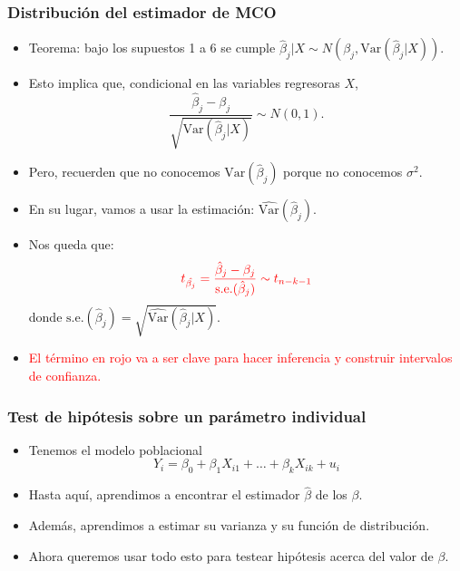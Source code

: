 \documentclass{beamer}
\begin{document}
\begin{frame}[shrink=10]
\frametitle{Distribución del estimador de MCO}
\begin{itemize}
    \item Teorema: bajo los supuestos 1 a 6 se cumple $\hat{\beta}_j|X \sim N(\beta_j, \text{Var}(\hat{\beta}_j|X))$.
    \item Esto implica que, condicional en las variables regresoras $X$,
    $$\frac{\hat{\beta}_j - \beta_j}{\sqrt{\text{Var}(\hat{\beta}_j|X)}} \sim N(0, 1).$$
    \item Pero, recuerden que no conocemos $\text{Var}(\hat{\beta}_j)$ porque no conocemos $\sigma^2$.
    \item En su lugar, vamos a usar la estimación: $\hat{\text{Var}}(\hat{\beta}_j)$.
    \item Nos queda que:
    $$\color{red}t_{\hat{\beta_j}}=\frac{\hat{\beta}_j - \beta_j}{\text{s.e.}(\hat{\beta}_j)} \sim t_{n-k-1}$$ 
    donde $\text{s.e.}(\hat{\beta}_j) = \sqrt{\hat{\text{Var}}(\hat{\beta}_j|X)}$.
    \item \textcolor{red}{El término en rojo va a ser clave para hacer inferencia y construir intervalos de confianza.}
\end{itemize}
\end{frame}

\begin{frame}[shrink=10]
\frametitle{Test de hipótesis sobre un parámetro individual}
\begin{itemize}
    \item Tenemos el modelo poblacional
    $$Y_i = \beta_0 + \beta_1X_{i1} + \ldots + \beta_kX_{ik} + u_i$$
    \item Hasta aquí, aprendimos a encontrar el estimador $\hat{\beta}$ de los $\beta$.
    \item Además, aprendimos a estimar su varianza y su función de distribución.
    \item Ahora queremos usar todo esto para testear hipótesis acerca del valor de $\beta$.
    
\end{itemize}
\end{frame}
\end{document}
